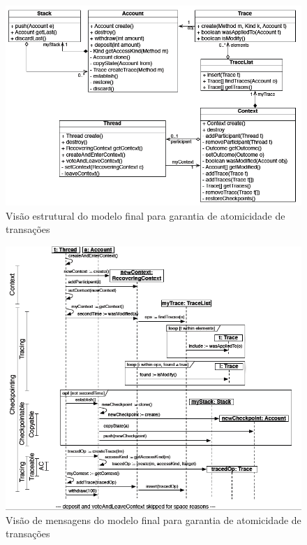 \begin{landscape}
\begin{figure}
	\centering
	\includegraphics[width=500px]{img/p87_class_final_model.png}
	\caption{Visão estrutural do modelo final para garantia de atomicidade de transações}\label{fig:p87_class_final_model}
\end{figure}
\end{landscape}

\begin{landscape}
\begin{figure}
	\centering
	\includegraphics[scale=0.7]{img/p87_sequence_final_model.png}
	\caption{Visão de mensagens do modelo final para garantia de atomicidade de transações}\label{fig:p87_sequence_final_model}
\end{figure}
\end{landscape}


